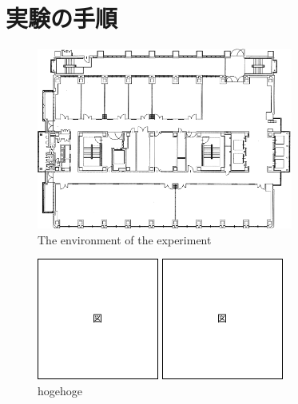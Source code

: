 
\section{実験の手順}

\begin{figure}[h]
  \centering
  \includegraphics[keepaspectratio, scale=0.80] {images/RobotGuidance_cit3f.png}
  \captionsetup{justification=raggedright} %
  \caption{The environment of the experiment}
  \label{Fig:RobotGuidance_cit3f}
\end{figure}

\begin{figure}[h]
  \centering
  \begin{minipage}[c]{65mm} 
      \centering
      \includegraphics[height=40mm]{images/figure.png}
  \end{minipage}
  \begin{minipage}[c]{65mm} 
      \centering
      \includegraphics[height=40mm]{images/figure.png}
  \end{minipage}
  \caption{hogehoge}
  \label{Fig:4.1hoge}
\end{figure}

\newpage
